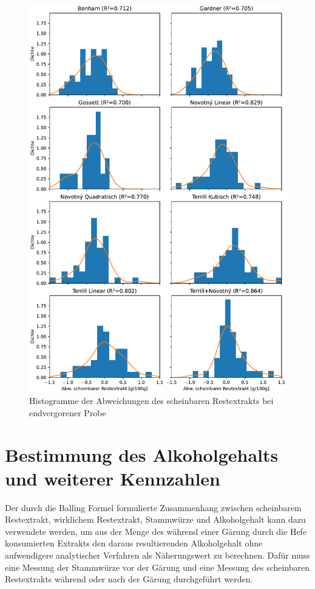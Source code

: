 \documentclass[a4paper,parskip=half]{scrartcl}
\begin{document}
\begin{figure}[H]
\centering
\includegraphics[width=14cm]{graph_ae.pdf}
\caption{Histogramme der Abweichungen des scheinbaren Restextrakts bei endvergorener Probe}
\label{fig:aegraph}
\end{figure}

\section*{Bestimmung des Alkoholgehalts und weiterer Kennzahlen}

Der durch die Balling Formel formulierte Zusammenhang zwischen
scheinbarem Restextrakt, wirklichem Restextrakt, Stammwürze
und Alkoholgehalt kann dazu verwendete werden, um aus der
Menge des während einer Gärung durch die Hefe konsumierten
Extrakts den daraus resultierenden Alkoholgehalt ohne aufwendigere
analytischer Verfahren als Näherungswert zu berechnen. Dafür muss
eine Messung der Stammwürze vor der Gärung und eine Messung des
scheinbaren Restextrakts während oder nach der Gärung durchgeführt
werden. \autocite{MEBAK2013,Spedding2016}
\end{document}
